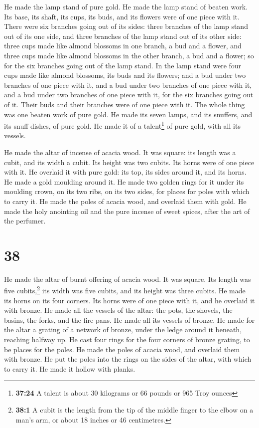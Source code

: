  He made the lamp stand of pure gold. He made the lamp
stand of beaten work. Its base, its shaft, its cups, its buds, and its
flowers were of one piece with it.  There were six
branches going out of its sides: three branches of the lamp stand out of
its one side, and three branches of the lamp stand out of its other
side:  three cups made like almond blossoms in one
branch, a bud and a flower, and three cups made like almond blossoms in
the other branch, a bud and a flower; so for the six branches going out
of the lamp stand.  In the lamp stand were four cups made
like almond blossoms, its buds and its flowers;  and a
bud under two branches of one piece with it, and a bud under two
branches of one piece with it, and a bud under two branches of one piece
with it, for the six branches going out of it.  Their
buds and their branches were of one piece with it. The whole thing was
one beaten work of pure gold.  He made its seven lamps,
and its snuffers, and its snuff dishes, of pure gold.  He
made it of a talent\footnote{\textbf{37:24} A talent is about 30
  kilograms or 66 pounds or 965 Troy ounces} of pure gold, with all its
vessels.

 He made the altar of incense of acacia wood. It was
square: its length was a cubit, and its width a cubit. Its height was
two cubits. Its horns were of one piece with it.  He
overlaid it with pure gold: its top, its sides around it, and its horns.
He made a gold moulding around it.  He made two golden
rings for it under its moulding crown, on its two ribs, on its two
sides, for places for poles with which to carry it.  He
made the poles of acacia wood, and overlaid them with gold.
 He made the holy anointing oil and the pure incense of
sweet spices, after the art of the perfumer.

\hypertarget{section-37}{%
\section{38}\label{section-37}}

 He made the altar of burnt offering of acacia wood. It
was square. Its length was five cubits,\footnote{\textbf{38:1} A cubit
  is the length from the tip of the middle finger to the elbow on a
  man's arm, or about 18 inches or 46 centimetres.} its width was five
cubits, and its height was three cubits.  He made its
horns on its four corners. Its horns were of one piece with it, and he
overlaid it with bronze.  He made all the vessels of the
altar: the pots, the shovels, the basins, the forks, and the fire pans.
He made all its vessels of bronze.  He made for the altar
a grating of a network of bronze, under the ledge around it beneath,
reaching halfway up.  He cast four rings for the four
corners of bronze grating, to be places for the poles.  He
made the poles of acacia wood, and overlaid them with bronze.
 He put the poles into the rings on the sides of the
altar, with which to carry it. He made it hollow with planks.


